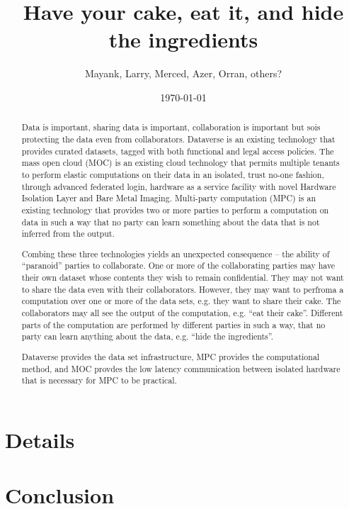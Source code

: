 \documentclass[twoside]{article}
\begin{document}
\title{Have your cake, eat it, and hide the ingredients}

\author{Mayank, Larry, Merced, Azer, Orran, others?}

\date{\today}

\maketitle


\begin{abstract}
Data is important, sharing data is important, collaboration is important but sois protecting the data even from collaborators.
Dataverse is an existing technology that provides curated datasets, tagged with both functional and legal access policies.  The mass open cloud (MOC) is an existing cloud technology that permits multiple tenants to perform elastic computations on their data in an isolated, trust no-one fashion, through advanced federated login, hardware as a service facility with novel Hardware Isolation Layer and  Bare Metal Imaging.   Multi-party computation (MPC) is an existing technology that provides two or more parties to perform a computation on data in such a way that no party can learn something about the data that is not inferred from the output.

Combing these three technologies yields an unexpected consequence -- the ability of ``paranoid'' parties to collaborate.  One or more of the collaborating parties may have their own dataset whose contents they wish to remain confidential.  They may not want to share the data even with their collaborators.   However, they may want to perfroma a computation over one or more of the data sets, e.g. they want to share their cake.   The collaborators may all see the output of the computation, e.g. ``eat their cake''.   Different parts of the computation are performed by different parties in such a way, that no party can learn anything about the data, e.g. ``hide the ingredients''.

Dataverse provides the data set infrastructure, MPC provides the computational method, and MOC provdes the low latency communication between isolated hardware that is necessary for MPC to be practical.
\end{abstract}



%
\section{Details}
%
\section{Conclusion}



\end{document}
